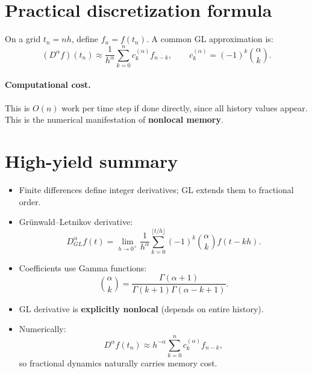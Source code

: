 
\section{Practical discretization formula}

On a grid $t_n = nh$, define $f_n=f(t_n)$.
A common GL approximation is:
\begin{equation}
(D^\alpha f)(t_n)
\approx
\frac{1}{h^\alpha}\sum_{k=0}^{n}c_k^{(\alpha)}f_{n-k},
\qquad
c_k^{(\alpha)}=(-1)^k\binom{\alpha}{k}.
\end{equation}

\paragraph{Computational cost.}
This is $O(n)$ work per time step if done directly, since all history values appear.
This is the numerical manifestation of \textbf{nonlocal memory}.


\section{High-yield summary}

\begin{itemize}
\item Finite differences define integer derivatives; GL extends them to fractional order.
\item Grünwald--Letnikov derivative:
\[
D_{GL}^\alpha f(t)
=
\lim_{h\to 0^+}\frac{1}{h^\alpha}
\sum_{k=0}^{\lfloor t/h\rfloor}(-1)^k\binom{\alpha}{k}f(t-kh).
\]
\item Coefficients use Gamma functions:
\[
\binom{\alpha}{k}=\frac{\Gamma(\alpha+1)}{\Gamma(k+1)\Gamma(\alpha-k+1)}.
\]
\item GL derivative is \textbf{explicitly nonlocal} (depends on entire history).
\item Numerically:
\[
D^\alpha f(t_n)\approx h^{-\alpha}\sum_{k=0}^n c_k^{(\alpha)}f_{n-k},
\]
so fractional dynamics naturally carries memory cost.
\end{itemize}
